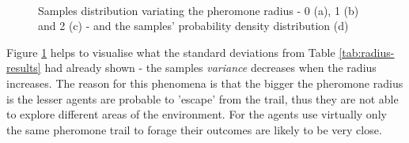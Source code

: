 \begin{figure}[H]
\myfloatalign
{} \quad
{} \\
 \quad
{}

\caption[Radius variation - samples distributions]{Samples distribution variating the pheromone radius - 0 (a), 1 (b) and 2 (c) - and the samples' probability density distribution (d)}\label{fig:radius}
\end{figure}

Figure \ref{fig:radius} helps to visualise what the standard deviations from Table \ref{tab:radius-results} had already shown - the samples \emph{variance} decreases when the radius increases. The reason for this phenomena is that the bigger the pheromone radius is the lesser agents are probable to 'escape' from the trail, thus they are not able to explore different areas of the environment. For the agents use virtually only the same pheromone trail to forage their outcomes are likely to be very close.  

